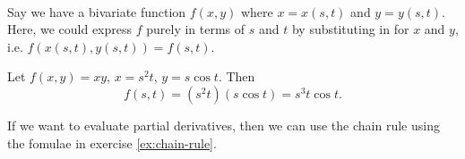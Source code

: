 \documentclass[../multivariate_calculus.tex]{subfiles}
\begin{document}
        \paragraph{}
        Say we have a bivariate function $f(x,y)$ where $x=x(s,t)$ and $y=y(s,t)$.
        Here, we could express $f$ purely in terms of $s$ and $t$ by substituting in for $x$ and $y$, i.e. $f(x(s,t),y(s,t))=f(s,t)$.
        \begin{example}
            Let $f(x,y)=xy$, $x=s^2t$, $y=s\cos t$. Then
            \begin{equation}
                f(s,t)=(s^2t)(s\cos t)=s^3 t\cos t.
            \end{equation}
        \end{example}
        If we want to evaluate partial derivatives, then we can use the chain rule using the fomulae in exercise \ref{ex:chain-rule}.
\end{document}
